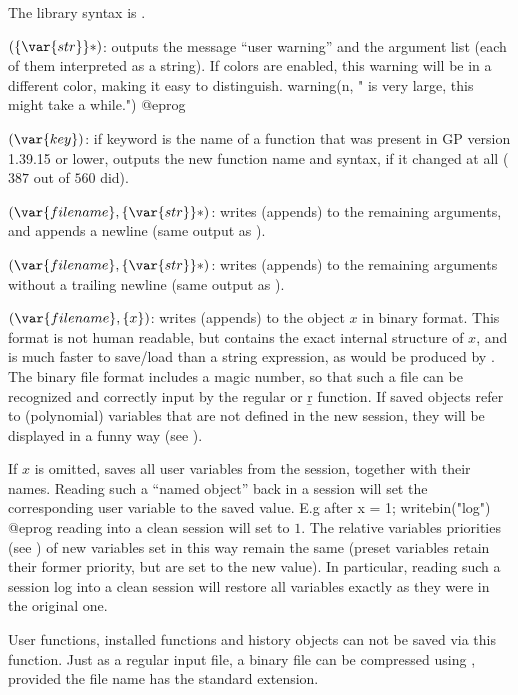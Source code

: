 The library syntax is .

$(\{\var{str}\}*)$: \label{se:warning}outputs the message ``user warning''
and the argument list (each of them interpreted as a string).
If colors are enabled, this warning will be in a different color,
making it easy to distinguish.
\bprog
warning(n, " is very large, this might take a while.")
@eprog

$(\var{key})$: \label{se:whatnow}if keyword  is the name of a function that was present in GP
version 1.39.15 or lower, outputs the new function name and syntax, if it
changed at all ($387$ out of $560$ did).

$(\var{filename},\{\var{str}\}*)$: \label{se:write}writes (appends) to  the remaining arguments, and appends a
newline (same output as ).

$(\var{filename},\{\var{str}\}*)$: \label{se:write1}writes (appends) to  the remaining arguments without a
trailing newline (same output as ).

$(\var{filename},\{x\})$: \label{se:writebin}writes (appends) to
 the object $x$ in binary format. This format is not human
readable, but contains the exact internal structure of $x$, and is much
faster to save/load than a string expression, as would be produced by
. The binary file format includes a magic number, so that such a
file can be recognized and correctly input by the regular  or \b{r}
function. If saved objects refer to (polynomial) variables that are not
defined in the new session, they will be displayed in a funny way (see
).

If $x$ is omitted, saves all user variables from the session, together with
their names. Reading such a ``named object'' back in a  session will set
the corresponding user variable to the saved value. E.g after
\bprog
x = 1; writebin("log")
@eprog\noindent
reading  into a clean session will set  to $1$.
The relative variables priorities (see ) of new variables
set in this way remain the same (preset variables retain their former
priority, but are set to the new value). In particular, reading such a
session log into a clean session will restore all variables exactly as they
were in the original one.

User functions, installed functions and history objects can not be saved via
this function. Just as a regular input file, a binary file can be compressed
using , provided the file name has the standard 
extension.

